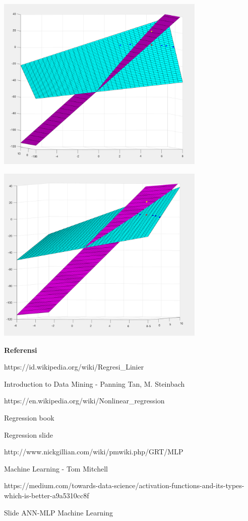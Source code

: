 \documentclass[12pt]{article}%
\begin{document}
\begin{enumerate}
\begin{enumerate}
		\par \includegraphics[width=10cm]{ass2clo2fig14} 
		\par \includegraphics[width=10cm]{ass2clo2fig15} 
	\end{enumerate}


\end{enumerate}

\par \textbf{Referensi}
\par [1] https://id.wikipedia.org/wiki/Regresi_Linier
\par [2] Introduction to Data Mining - Panning Tan, M. Steinbach
\par [3] https://en.wikipedia.org/wiki/Nonlinear_regression
\par [4] Regression book
\par [5] Regression slide
\par [6] http://www.nickgillian.com/wiki/pmwiki.php/GRT/MLP
\par [7] Machine Learning - Tom Mitchell
\par [8] https://medium.com/towards-data-science/activation-functions-and-its-types-which-is-better-a9a5310cc8f
\par [9] Slide ANN-MLP Machine Learning
\end{document}
